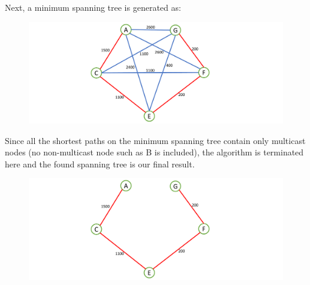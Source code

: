 \documentclass[10pt,letterpaper]{article}
\begin{document}
Next, a minimum spanning tree is generated as:
\begin{figure}[h!]
\centering
\includegraphics[width=160mm]{PSol6_Q7_2.pdf}
\end{figure}

Since all the shortest paths on the minimum spanning tree contain only multicast nodes (no non-multicast node such as B is included), the algorithm is terminated here and the found spanning tree is our final result.
\begin{figure}[h!]
\centering
\includegraphics[width=160mm]{PSol6_Q7_3.pdf}
\end{figure}
\end{document}
